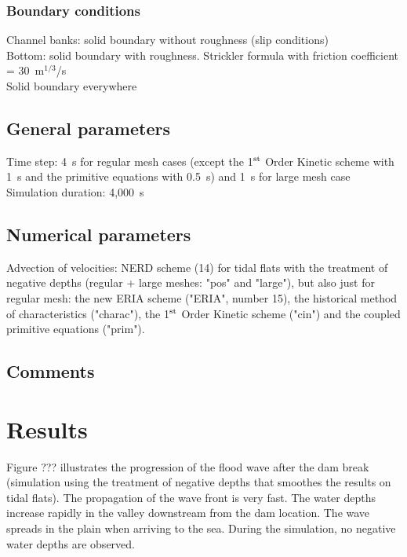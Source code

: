 \subsubsection{Boundary conditions}
%
Channel banks: solid boundary without roughness (slip conditions)\\
Bottom: solid boundary with roughness.
Strickler formula with friction coefficient = 30~m$^{1/3}$/s\\
Solid boundary everywhere
%
\subsection{General parameters}
%
Time step: 4~s for regular mesh cases
(except the 1$^{\rm{st}}$ Order Kinetic scheme with 1~s and the primitive
equations with 0.5~s) and 1~s for large mesh case\\
Simulation duration: 4,000~s
%
%
%
\subsection{Numerical parameters}
%
Advection of velocities:
NERD scheme (14) for tidal flats with the treatment of negative
depths (regular + large meshes: "pos" and "large"),
but also just for regular mesh:
the new ERIA scheme ("ERIA", number 15),
the historical method of characteristics ("charac"),
the 1$^{\rm{st}}$ Order Kinetic scheme ("cin")
and the coupled primitive equations ("prim").
%
\subsection{Comments}
%
%
%
\section{Results}
%
Figure ??? illustrates the progression of the flood wave after the dam
break (simulation using the treatment of negative depths that smoothes
the results on tidal flats).
The propagation of the wave front is very fast.
The water depths increase rapidly in the valley downstream from the dam
location.
The wave spreads in the plain when arriving to the sea.
During the simulation, no negative water depths are observed.
%
